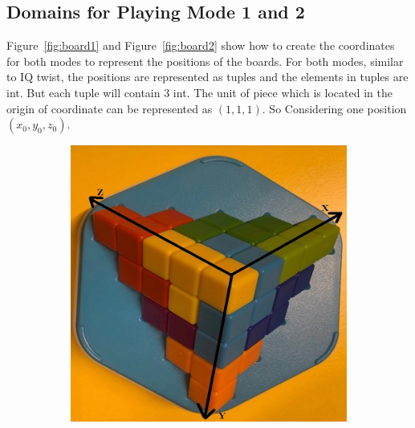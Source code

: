\subsection{Domains for Playing Mode 1 and 2}
\label{sec:3Ddomains}
Figure~\ref{fig:board1} and Figure~\ref{fig:board2} show how to create the coordinates for both modes to represent the positions of the boards. For both modes, similar to IQ twist, the positions are represented as tuples and the elements in tuples are int. But each tuple will contain 3 int. The unit of piece which is located in the origin of coordinate can be represented as $(1,1,1)$. So Considering one position $(x_{0},y_{0},z_{0})$.
\begin{figure}[htbp]
\centering
\begin{subfigure}[b]{.4\textwidth}
\centering
\includegraphics[width=\textwidth]{figs/ZIGZAGmodel1board.jpg}
\caption{}
\label{figure:mode1A}
\end{subfigure}
\begin{subfigure}[b]{.4\textwidth}
\centering

\end{subfigure}
\end{figure}
